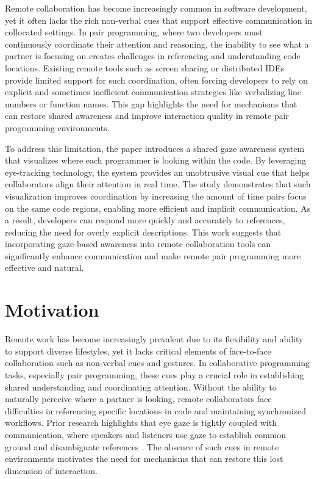 Remote collaboration has become increasingly common in software development, yet it often lacks the rich non-verbal cues that support effective communication in collocated settings. In pair programming, where two developers must continuously coordinate their attention and reasoning, the inability to see what a partner is focusing on creates challenges in referencing and understanding code locations. Existing remote tools such as screen sharing or distributed IDEs provide limited support for such coordination, often forcing developers to rely on explicit and sometimes inefficient communication strategies like verbalizing line numbers or function names. This gap highlights the need for mechanisms that can restore shared awareness and improve interaction quality in remote pair programming environments.

To address this limitation, the paper introduces a shared gaze awareness system that visualizes where each programmer is looking within the code. By leveraging eye-tracking technology, the system provides an unobtrusive visual cue that helps collaborators align their attention in real time. The study demonstrates that such visualization improves coordination by increasing the amount of time pairs focus on the same code regions, enabling more efficient and implicit communication. As a result, developers can respond more quickly and accurately to references, reducing the need for overly explicit descriptions. This work suggests that incorporating gaze-based awareness into remote collaboration tools can significantly enhance communication and make remote pair programming more effective and natural.

\section{Motivation}
Remote work has become increasingly prevalent due to its flexibility and ability to support diverse lifestyles, yet it lacks critical elements of face-to-face collaboration such as non-verbal cues and gestures. In collaborative programming tasks, especially pair programming, these cues play a crucial role in establishing shared understanding and coordinating attention. Without the ability to naturally perceive where a partner is looking, remote collaborators face difficulties in referencing specific locations in code and maintaining synchronized workflows. Prior research highlights that eye gaze is tightly coupled with communication, where speakers and listeners use gaze to establish common ground and disambiguate references \cite{griffin2000eyes, hanna2007speakers}. The absence of such cues in remote environments motivates the need for mechanisms that can restore this lost dimension of interaction.


